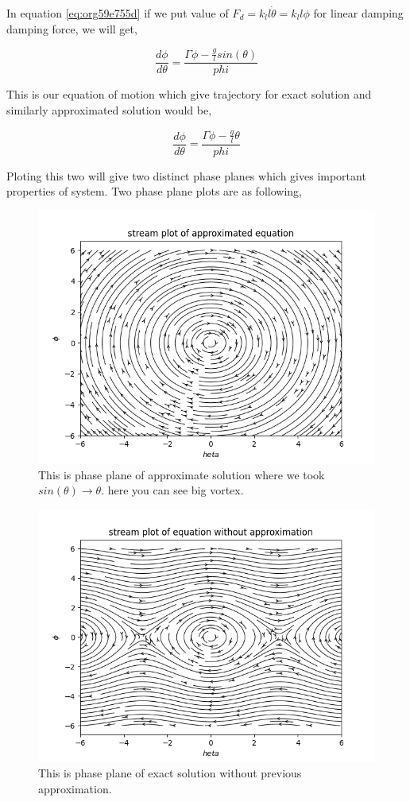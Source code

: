 \documentclass[11pt,a4paper]{article}
\begin{document}
In equation \ref{eq:org59e755d} if we put value of \(F_{d} = k_{l}l\dot{\theta} = k_{l}l\phi\) for linear damping damping force, we will get,

\begin{equation}
\label{eq:orgf1c3b1c}
\frac{d\phi}{d\theta}=\frac{\Gamma\phi-\frac{g}{l}sin(\theta)}{phi}
\end{equation}

This is our equation of motion which give trajectory for exact solution and similarly approximated solution would be,

\begin{equation}
\label{eq:org33dc9bc}
\frac{d\phi}{d\theta}=\frac{\Gamma\phi-\frac{g}{l}\theta}{phi}
\end{equation}

Ploting this two will give two distinct phase planes which gives important properties of system. Two phase plane plots are as following, 


\begin{figure}[htbp]
\centering
\includegraphics[width=0.8 \textwidth]{approlstr.png}
\caption{\label{fig:orgecf55ad}This is phase plane of approximate solution where we took \(sin(\theta) \to \theta\). here you can see big vortex.}
\end{figure}

\begin{figure}[htbp]
\centering
\includegraphics[width=0.8 \textwidth]{exactlstr.png}
\caption{\label{fig:org792f3b9}This is phase plane of exact solution without previous approximation.}
\end{figure}
\end{document}
